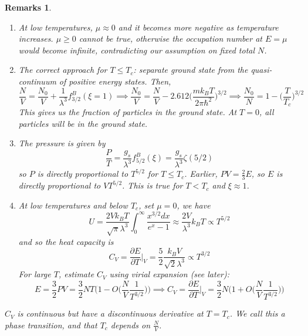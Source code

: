 \documentclass[a4paper]{article}
\newtheorem{remarks}{Remarks}[section]
\theoremstyle{new}
\begin{document}
\begin{remarks}\leavevmode
\begin{enumerate}
    \item At low temperatures, $\mu\approx 0$ and it becomes more negative as temperature increases. $\mu\geq0$ cannot be true, otherwise the occupation number at $E=\mu$ would become infinite, contradicting our assumption on fixed total $N$.
    \item The correct approach for $T\leq T_c$: separate ground state from the quasi-continuum of positive energy states. Then,
$$\frac{N}{V}=\frac{N_0}{V}+\frac{1}{\lambda^3}f_{3/2}^B(\xi=1)\implies\frac{N_0}{V}=\frac{N}{V}-2.612\bigg(\frac{mk_BT}{2\pi\hbar^2}\bigg)^{3/2}\implies\frac{N_0}{N}=1-\bigg(\frac{T}{T_c}\bigg)^{3/2}$$
This gives us the fraction of particles in the ground state. At $T=0$, all particles will be in the ground state.
\begin{center}
\end{center}
\item The pressure is given by
$$\frac{P}{T}=\frac{g_s}{\lambda^3}f_{5/2}^B(\xi)=\frac{g_s}{\lambda^3}\zeta(5/2)$$
so $P$ is directly proportional to $T^{5/2}$ for $T\leq T_c$. Earlier, $PV=\frac{2}{3}E$, so $E$ is directly proportional to $VT^{5/2}$. This is true for $T< T_c$ and $\xi\approx 1$. 
\item At low temperatures and below $T_c$, set $\mu=0$, we have
$$U=\frac{2Vk_BT}{\sqrt{\pi}\lambda^3}\int_0^\infty\frac{x^{3/2}dx}{e^x-1}\approx\frac{2V}{\lambda^3}k_BT\propto T^{5/2}$$
and so the heat capacity is
$$C_V=\frac{\partial E}{\partial T}\bigg|_V=\frac{5}{2}\frac{k_BV}{\sqrt{2}\lambda^3}\propto T^{3/2}$$
For large $T$, estimate $C_V$ using virial expansion (see later):
$$E=\frac{3}{2}PV=\frac{3}{2}NT\bigg(1-O\bigg(\frac{N}{V}\frac{1}{T^{3/2}}\bigg)\bigg)\implies C_V=\frac{\partial E}{\partial T}\bigg|_V=\frac{3}{2}N\bigg(1+O\bigg(\frac{N}{V}\frac{1}{T^{3/2}}\bigg)\bigg)$$
\begin{center}
\end{center}
\end{enumerate}
\item $C_V$ is continuous but have a discontinuous derivative at $T=T_c$. We call this a phase transition, and that $T_c$ depends on $\frac{N}{V}$.
\end{remarks}
\end{document}
